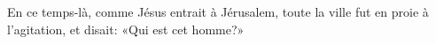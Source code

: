 En ce temps-là, comme Jésus entrait à Jérusalem,
	toute la ville fut en proie à l’agitation, et disait: «Qui est cet homme?»
